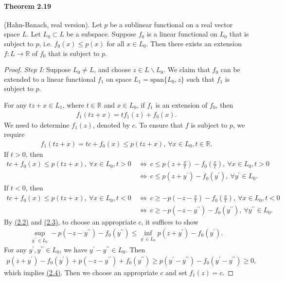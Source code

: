 \documentclass{article}
\begin{document}
\paragraph{Theorem 2.19\label{thm:2.19}} (Hahn-Banach, real version). Let $p$ be a sublinear functional on a real vector space $L$. Let $L_0\subset L$ be a subspace. Suppose $f_0$ is a linear functional on $L_0$ that is subject to $p$, i.e. $f_0(x)\leq p(x)$ for all $x\in L_0$. Then there exists an extension $f:L\to\mathbb{R}$ of $f_0$ that is subject to $p$.
\begin{proof}
\textit{Step I:} Suppose $L_0\neq L$, and choose $z\in L\backslash L_0$. We claim that $f_0$ can be extended to a linear functional $f_1$ on space $L_1=\mathrm{span}\{L_0,z\}$ such that $f_1$ is subject to $p$.
\vspace{0.1cm}

For any $tz+x\in L_1$, where $t\in\mathbb{R}$ and $x\in L_0$, if $f_1$ is an extension of $f_0$, then
\begin{align*}
	f_1(tz+x) = tf_1(z) + f_0(x).
\end{align*}
We need to determine $f_1(z)$, denoted by $c$. To ensure that $f$ is subject to $p$, we require
\begin{align*}
	f_1(tz+x)=tc+f_0(x)\leq p(tz+x),\ \forall x\in L_0,t\in\mathbb{R}.
\end{align*}
If $t>0$, then
\begin{align*}
	tc+f_0(x)\leq p(tz+x),\ \forall x\in L_0,t>0\ &\Leftrightarrow\ c\leq p\left(z+\frac{x}{t}\right) - f_0\left(\frac{x}{t}\right),\ \forall x\in L_0,t>0\\ &\Leftrightarrow\ c\leq p(z+y^\prime) - f_0(y^\prime),\ \forall y^\prime\in L_0.\tag{2.2}\label{eq:2.2}
\end{align*}
If $t<0$, then
\begin{align*}
	tc+f_0(x)\leq p(tz+x),\ \forall x\in L_0,t<0\ &\Leftrightarrow\ c\geq -p\left(-z-\frac{x}{t}\right) - f_0\left(\frac{x}{t}\right),\ \forall x\in L_0,t<0\\ &\Leftrightarrow\ c\geq -p(-z-y^{\prime\prime}) - f_0(y^{\prime\prime}),\ \forall y^{\prime\prime}\in L_0.\tag{2.3}\label{eq:2.3}
\end{align*}
By \hyperref[eq:2.2]{(2.2)} and \hyperref[eq:2.3]{(2.3)}, to choose an appropriate $c$, it suffices to show
\begin{align*}
	\sup_{y^{\prime\prime}\in L_0} -p(-z-y^{\prime\prime})-f_0(y^{\prime\prime}) \leq \inf_{y^\prime\in L_0} p(z+y^\prime) - f_0(y^\prime).\tag{2.4}\label{eq:2.4}
\end{align*}
For any $y^\prime,y^{\prime\prime}\in L_0$, we have $y^\prime-y^{\prime\prime}\in L_0$. Then
\begin{align*}
	p(z+y^\prime) - f_0(y^\prime) + p(-z-y^{\prime\prime}) + f_0(y^{\prime\prime}) \geq p(y^\prime-y^{\prime\prime}) - f_0(y^\prime-y^{\prime\prime})\geq 0,
\end{align*}
which implies \hyperref[eq:2.4]{(2.4)}. Then we choose an appropriate $c$ and set $f_1(z)=c$. 


\end{proof}
\end{document}
